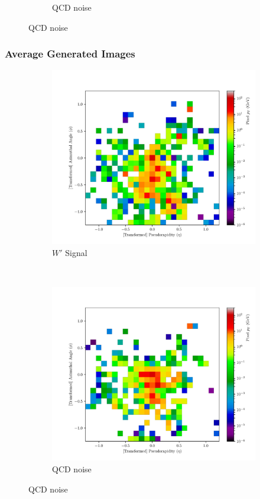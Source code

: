\documentclass{beamer}
\begin{document}
\begin{frame}
\begin{figure}[H]
\begin{subfigure}[t]{0.5\linewidth}
				\caption{QCD noise}
			\end{subfigure}


		\end{figure}
	\end{frame}

	\begin{frame}
		\frametitle{Average Generated Images}
		\begin{figure}[H]
			\centering
			\begin{subfigure}[t]{0.5\linewidth}
				\centering
				\includegraphics[width=1.0\linewidth]{av_sig_gen_24k}
				\caption{$W'$ Signal}
			\end{subfigure}%
			~ 
			\begin{subfigure}[t]{0.5\linewidth}
				\centering
				\includegraphics[width=1.0\linewidth]{av_noise_gen_24k}
				\caption{QCD noise}
			\end{subfigure}
			
			
		\end{figure}
	\end{frame}
	
\end{document}
